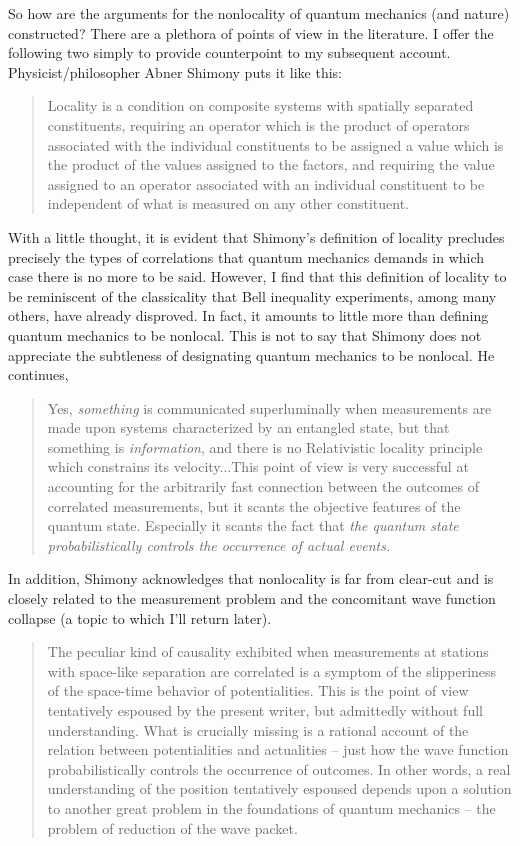 \documentclass[12pt]{article}
\begin{document}
So how are the arguments for the nonlocality of quantum mechanics (and nature) constructed? There are a plethora of points of view in the literature.  I offer the following two simply to provide counterpoint to my subsequent account. Physicist/philosopher Abner Shimony puts it like this\cite{Shi13}:
\begin{quote}
Locality is a condition on composite systems with spatially separated constituents, requiring an operator which is the product of operators associated with the individual constituents to be assigned a value which is the product of the values assigned to the factors, and requiring the value assigned to an operator associated with an individual constituent to be independent of what is measured on any other constituent.
\end{quote}
With a little thought, it is evident that Shimony's definition of locality precludes precisely the types of correlations that quantum mechanics demands in which case there is no more to be said. However, I find that this definition of locality to be reminiscent of the classicality that Bell inequality experiments, among many others, have already disproved. In fact, it amounts to little more than defining quantum mechanics to be nonlocal. This is not to say that Shimony does not appreciate the subtleness of designating quantum mechanics to be nonlocal. He continues,
\begin{quote}
Yes, {\it something} is communicated superluminally when measurements are made upon systems characterized by an entangled state, but that something is {\it information}, and there is no Relativistic locality principle which constrains its velocity...This point of view is very successful at accounting for the arbitrarily fast connection between the outcomes of correlated measurements, but it scants the objective features of the quantum state. Especially it scants the fact that {\it the quantum state probabilistically controls the occurrence of actual events.}
\end{quote}
In addition, Shimony acknowledges that nonlocality is far from clear-cut and is closely related to the measurement problem and the concomitant wave function collapse (a topic to which I'll return later).
\begin{quote}
The peculiar kind of causality exhibited when measurements at stations with space-like separation are correlated is a symptom of the slipperiness of the space-time behavior of potentialities. This is the point of view tentatively espoused by the present writer, but admittedly without full understanding. What is crucially missing is a rational account of the relation between potentialities and actualities -- just how the wave function probabilistically controls the occurrence of outcomes. In other words, a real understanding of the position tentatively espoused depends upon a solution to another great problem in the foundations of quantum mechanics -- the problem of reduction of the wave packet.
\end{quote}
\end{document}
